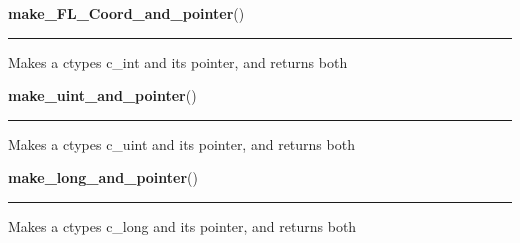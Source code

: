     \label{xformslib:library:make_int_and_pointer}

    \vspace{0.5ex}

\hspace{.8\funcindent}\begin{boxedminipage}{\funcwidth}

    \raggedright \textbf{make\_FL\_Coord\_and\_pointer}()

    \vspace{-1.5ex}

    \rule{\textwidth}{0.5\fboxrule}
\setlength{\parskip}{2ex}
    Makes a ctypes c\_int and its pointer, and returns both

\setlength{\parskip}{1ex}
    \end{boxedminipage}

    \label{xformslib:library:make_uint_and_pointer}

    \vspace{0.5ex}

\hspace{.8\funcindent}\begin{boxedminipage}{\funcwidth}

    \raggedright \textbf{make\_uint\_and\_pointer}()

    \vspace{-1.5ex}

    \rule{\textwidth}{0.5\fboxrule}
\setlength{\parskip}{2ex}
    Makes a ctypes c\_uint and its pointer, and returns both

\setlength{\parskip}{1ex}
    \end{boxedminipage}

    \label{xformslib:library:make_long_and_pointer}

    \vspace{0.5ex}

\hspace{.8\funcindent}\begin{boxedminipage}{\funcwidth}

    \raggedright \textbf{make\_long\_and\_pointer}()

    \vspace{-1.5ex}

    \rule{\textwidth}{0.5\fboxrule}
\setlength{\parskip}{2ex}
    Makes a ctypes c\_long and its pointer, and returns both

\setlength{\parskip}{1ex}
    \end{boxedminipage}


